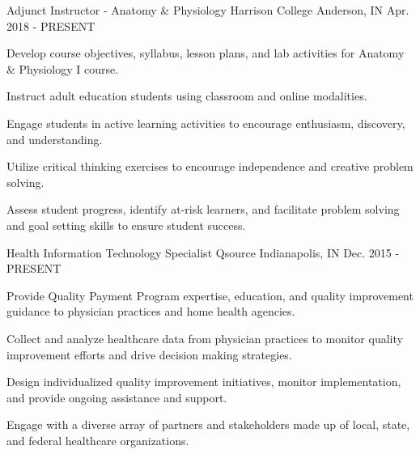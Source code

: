 

\begin{cventries}

  \cventry
    {Adjunct Instructor - Anatomy \& Physiology}
    {Harrison College}
    {Anderson, IN}
    {Apr. 2018 - PRESENT}
    {
      \begin{cvitems}
      \item {Develop course objectives, syllabus, lesson plans, and lab activities for Anatomy \& Physiology I course.} 
      \item {Instruct adult education students using classroom and online modalities.}
        \item {Engage students in active learning activities to encourage enthusiasm, discovery, and understanding.}
        \item {Utilize critical thinking exercises to encourage independence and creative problem solving.}
      \item {Assess student progress, identify at-risk learners, and facilitate problem solving and goal setting skills to ensure student success.}
        \end{cvitems}
    }

  \cventry
    {Health Information Technology Specialist} %
    {Qsource} %
    {Indianapolis, IN} %
    {Dec. 2015 - PRESENT} %
    {
      \begin{cvitems} %
      \item {Provide Quality Payment Program expertise, education, and quality improvement guidance to physician practices and home health agencies.}
      \item {Collect and analyze healthcare data from physician practices to monitor quality improvement efforts and drive decision making strategies.}
        \item {Design individualized quality improvement initiatives, monitor implementation, and provide ongoing assistance and support.}
    \item {Engage with a diverse array of partners and stakeholders made up of local, state, and federal healthcare organizations.}
  \end{cvitems}
    }


\end{cventries}
